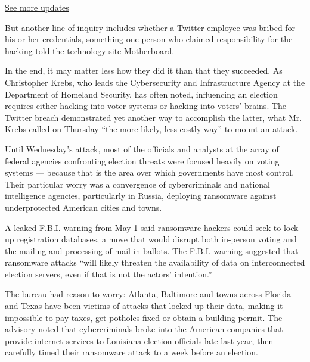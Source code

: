 \href{https://www.nytimes.com/2020/07/31/us/elections/biden-vs-trump.html?action=click\&pgtype=Article\&state=default\&region=MAIN_CONTENT_1\&context=storylines_live_updates}{See
more updates}

But another line of inquiry includes whether a Twitter employee was
bribed for his or her credentials, something one person who claimed
responsibility for the hacking told the technology site
\href{https://slack-redir.net/link?url=https\%3A\%2F\%2Fwww.vice.com\%2Fen_us\%2Farticle\%2Fjgxd3d\%2Ftwitter-insider-access-panel-account-hacks-biden-uber-bezos}{Motherboard}.

In the end, it may matter less how they did it than that they succeeded.
As Christopher Krebs, who leads the Cybersecurity and Infrastructure
Agency at the Department of Homeland Security, has often noted,
influencing an election requires either hacking into voter systems or
hacking into voters' brains. The Twitter breach demonstrated yet another
way to accomplish the latter, what Mr. Krebs called on Thursday ``the
more likely, less costly way'' to mount an attack.

Until Wednesday's attack, most of the officials and analysts at the
array of federal agencies confronting election threats were focused
heavily on voting systems --- because that is the area over which
governments have most control. Their particular worry was a convergence
of cybercriminals and national intelligence agencies, particularly in
Russia, deploying ransomware against underprotected American cities and
towns.

A leaked F.B.I. warning from May 1 said ransomware hackers could seek to
lock up registration databases, a move that would disrupt both in-person
voting and the mailing and processing of mail-in ballots. The F.B.I.
warning suggested that ransomware attacks ``will likely threaten the
availability of data on interconnected election servers, even if that is
not the actors' intention.''

The bureau had reason to worry:
\href{https://www.nytimes.com/2018/03/27/us/cyberattack-atlanta-ransomware.html}{Atlanta},
\href{https://www.nytimes.com/2019/05/22/us/baltimore-ransomware.html}{Baltimore}
and towns across Florida and Texas have been victims of attacks that
locked up their data, making it impossible to pay taxes, get potholes
fixed or obtain a building permit. The advisory noted that
cybercriminals broke into the American companies that provide internet
services to Louisiana election officials late last year, then carefully
timed their ransomware attack to a week before an election.

